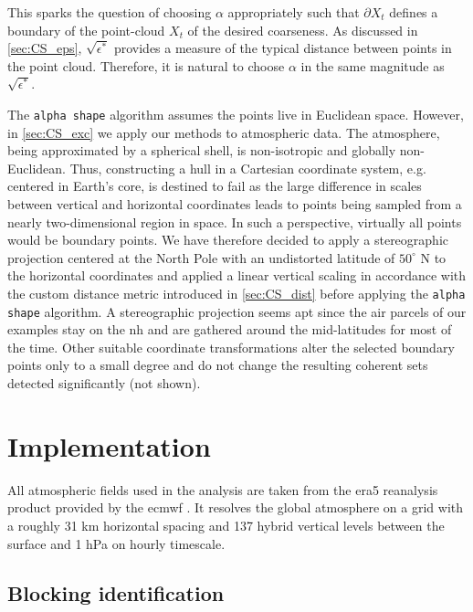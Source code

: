 This sparks the question of choosing $\alpha$ appropriately such that $\partial X_t$ defines a boundary of the point-cloud $X_t$ of the desired coarseness.
As discussed in \cref{sec:CS_eps}, $\sqrt{\epsilon^*}$ provides a measure of the typical distance between points in the point cloud. Therefore, it is natural to choose $\alpha$ in the same magnitude as $\sqrt{\epsilon^*}$.

The \texttt{alpha shape} algorithm assumes the points live in Euclidean space. However, in \cref{sec:CS_exc} we apply our methods to atmospheric data. The atmosphere, being approximated by a spherical shell, is non-isotropic and globally non-Euclidean. Thus, constructing a hull in a Cartesian coordinate system, e.g. centered in Earth's core, is destined to fail as the large difference in scales between vertical and horizontal coordinates leads to points being sampled from a nearly two-dimensional region in space. In such a perspective, virtually all points would be boundary points. We have therefore decided to apply a stereographic projection centered at the North Pole with an undistorted latitude of $50^{\circ}$ N to the horizontal coordinates and applied a linear vertical scaling in accordance with the custom distance metric introduced in \cref{sec:CS_dist} before applying the \texttt{alpha shape} algorithm. A stereographic projection seems apt since the air parcels of our examples stay on the \gls{nh} and are gathered around the mid-latitudes for most of the time. Other suitable coordinate transformations alter the selected boundary points only to a small degree and do not change the resulting coherent sets detected significantly (not shown).


\section{Implementation}\label{sec:CS_imp}

All atmospheric fields used in the analysis are taken from the \gls{era5} reanalysis product provided by the \gls{ecmwf} \parencite{hersbachERA5GlobalReanalysis2020}. It resolves the global atmosphere on a grid with a roughly 31 km horizontal spacing and 137 hybrid vertical levels between the surface and 1 hPa on hourly timescale.

\subsection{Blocking identification} \label{sec:CS_block}

